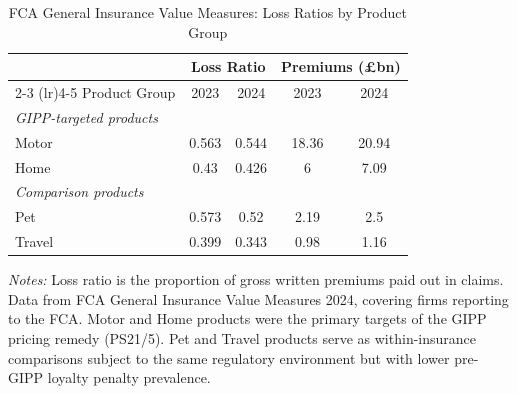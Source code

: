 \begin{table}[H]
\centering
\caption{FCA General Insurance Value Measures: Loss Ratios by Product Group}
\label{tab:fca}
\begin{threeparttable}
\begin{tabular}{lcccc}
\toprule
 & \multicolumn{2}{c}{Loss Ratio} & \multicolumn{2}{c}{Premiums (\pounds bn)} \\
\cmidrule(lr){2-3} \cmidrule(lr){4-5}
Product Group & 2023 & 2024 & 2023 & 2024 \\
\midrule
\multicolumn{5}{l}{\textit{GIPP-targeted products}} \\
\quad Motor & 0.563 & 0.544 & 18.36 & 20.94 \\
\quad Home & 0.43 & 0.426 & 6 & 7.09 \\
\midrule
\multicolumn{5}{l}{\textit{Comparison products}} \\
\quad Pet & 0.573 & 0.52 & 2.19 & 2.5 \\
\quad Travel & 0.399 & 0.343 & 0.98 & 1.16 \\
\bottomrule
\end{tabular}
\begin{tablenotes}[flushleft]
\small
\item \textit{Notes:} Loss ratio is the proportion of gross written premiums paid out in claims. Data from FCA General Insurance Value Measures 2024, covering firms reporting to the FCA. Motor and Home products were the primary targets of the GIPP pricing remedy (PS21/5). Pet and Travel products serve as within-insurance comparisons subject to the same regulatory environment but with lower pre-GIPP loyalty penalty prevalence.
\end{tablenotes}
\end{threeparttable}
\end{table}
